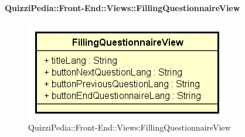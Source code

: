 \paragraph{QuizziPedia::Front-End::Views::FillingQuestionnaireView}
\begin{figure} [ht]
	\centering
	\includegraphics[scale=0.45]{UML/Classi/Front-End/QuizziPedia_Front-end_FillingQuestionnaireView.png}
	\caption{QuizziPedia::Front-End::Views:FillingQuestionnaireView}
\end{figure} \FloatBarrier
